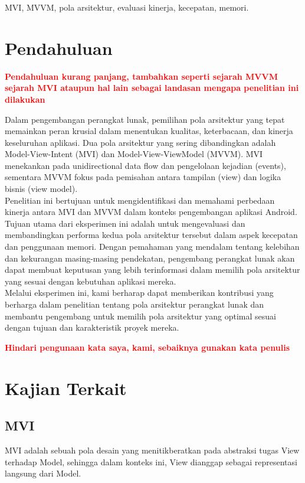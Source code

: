 \documentclass[conference]{IEEEtran}
\begin{document}
\begin{IEEEkeywords}
MVI, MVVM, pola arsitektur, evaluasi kinerja, kecepatan, memori.
\end{IEEEkeywords}

\section{Pendahuluan}

\textbf{\textcolor{red}{Pendahuluan kurang panjang, tambahkan seperti sejarah MVVM sejarah MVI ataupun hal lain sebagai landasan mengapa penelitian ini dilakukan}}

Dalam pengembangan perangkat lunak, pemilihan pola arsitektur yang tepat memainkan peran krusial dalam menentukan kualitas, keterbacaan, dan kinerja keseluruhan aplikasi. Dua pola arsitektur yang sering dibandingkan adalah Model-View-Intent (MVI) dan Model-View-ViewModel (MVVM). MVI menekankan pada unidirectional data flow dan pengelolaan kejadian (events), sementara MVVM fokus pada pemisahan antara tampilan (view) dan 
logika bisnis (view model). \\
\indent Penelitian ini bertujuan untuk mengidentifikasi dan memahami perbedaan kinerja antara MVI dan MVVM dalam konteks pengembangan aplikasi Android. Tujuan utama dari eksperimen ini adalah untuk mengevaluasi dan membandingkan performa kedua pola arsitektur tersebut dalam aspek kecepatan dan penggunaan memori. Dengan pemahaman yang mendalam tentang kelebihan dan kekurangan masing-masing pendekatan, pengembang perangkat lunak akan dapat membuat keputusan yang lebih terinformasi dalam memilih pola arsitektur yang sesuai dengan kebutuhan aplikasi mereka. \\
\indent Melalui eksperimen ini, kami berharap dapat memberikan kontribusi yang berharga dalam penelitian tentang pola arsitektur perangkat lunak dan membantu pengembang untuk memilih pola arsitektur yang optimal sesuai dengan tujuan dan karakteristik proyek mereka.


\textbf{\textcolor{red}{Hindari pengunaan kata saya, kami, sebaiknya gunakan kata penulis}}


\section{Kajian Terkait}

\subsection{MVI}
\indent MVI adalah sebuah pola desain yang menitikberatkan pada abstraksi tugas View terhadap Model, sehingga dalam konteks ini, View dianggap sebagai representasi langsung dari Model.
\end{document}
